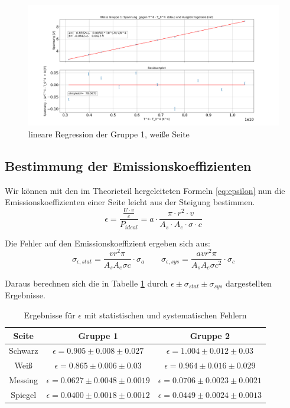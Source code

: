 \documentclass[a4paper, 11pt]{article}
\begin{document}
\begin{figure}[H]
	\centering
	\includegraphics[scale=0.35]{Bilder/Gruppe1_Weiss.png}%
	\caption{lineare Regression der Gruppe 1, weiße Seite}%
	\label{pic:LinregressG1weiss}%
\end{figure}


\subsection{Bestimmung der Emissionskoeffizienten}

Wir können mit den im Theorieteil hergeleiteten Formeln \ref{eq:epsilon} nun die Emissionskoeffizienten einer Seite leicht aus der Steigung bestimmen.
\begin{equation}
\epsilon = \frac{\frac{U \cdot v}{c}}{P_{ideal}} = a \cdot \frac{\pi \cdot r^2 \cdot v}{A_s \cdot A_e \cdot \sigma \cdot c}
\end{equation}

Die Fehler auf den Emissionskoeffizient ergeben sich aus:
\begin{equation}
\sigma_{\epsilon,stat}=\frac{v r^2 \pi}{A_s A_e \sigma c}\cdot  \sigma_a \qquad
\sigma_{\epsilon ,sys}=\frac{a v r^2 \pi}{A_sA_e \sigma c^2}\cdot \sigma_c
\end{equation}

Daraus berechnen sich die in Tabelle \ref{table:Epsilon} durch $\epsilon \pm \sigma_{stat}\pm \sigma_{sys} $ dargestellten Ergebnisse.
\begin{table}[H]
\Large
\centering
	\begin{tabular}{|c|c|c|}
	\hline Seite & Gruppe 1& Gruppe 2 \\
	\hline Schwarz& $\epsilon=0.905 \pm 0.008\pm 0.027$ &  $\epsilon=1.004 \pm  0.012 \pm 0.03 $\\
	\hline Weiß & $\epsilon=0.865 \pm 0.006\pm 0.03$ & $\epsilon= 0.964\pm 0.016 \pm 0.029$\\
	\hline Messing & $\epsilon=0.0627 \pm 0.0048\pm 0.0019$ & $\epsilon=0.0706 \pm 0.0023\pm 0.0021$\\
	\hline Spiegel & $\epsilon=0.0400 \pm 0.0018\pm 0.0012$ & $\epsilon=0.0449 \pm 0.0024\pm 0.0013$\\
	\hline  
	\end{tabular}
\caption{Ergebnisse für $\epsilon$ mit statistischen und systematischen Fehlern}
\label{table:Epsilon}
\end{table}
\end{document}
